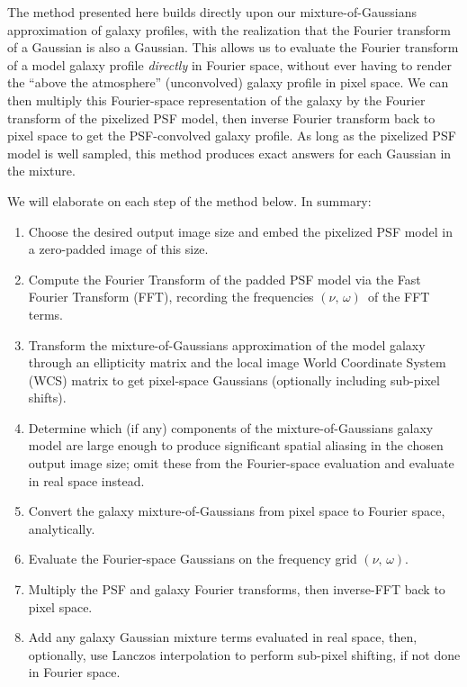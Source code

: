 \documentclass[11pt,letterpaper]{aastex63}
\newcommand{\pixelfreqs}{$(\nu,\, \omega)$}
\begin{document}
The method presented here builds directly upon our mixture-of-Gaussians
approximation of galaxy profiles, with the realization that the
Fourier transform of a Gaussian is also a Gaussian.  This allows us to
evaluate the Fourier transform of a model galaxy profile \emph{directly} in Fourier
space, without ever having to render the ``above the atmosphere''
(unconvolved) galaxy profile in pixel space.
We can then multiply this Fourier-space
representation of the galaxy by the Fourier transform of the pixelized
PSF model, then inverse Fourier transform back to pixel space to get
the PSF-convolved galaxy profile.
%
As long as the pixelized PSF model is well sampled, this method produces
exact answers for each Gaussian in the mixture.

We will elaborate on each step of the method below.  In summary:
\begin{enumerate}
\item Choose the desired output image size and embed the pixelized PSF
  model in a zero-padded image of this size.
\item Compute the Fourier Transform of the padded PSF model via the
  Fast Fourier Transform (FFT),
  recording the frequencies \pixelfreqs\ of the FFT terms.
\item Transform the mixture-of-Gaussians approximation of the model
  galaxy through an ellipticity matrix and the local image World
  Coordinate System (WCS) matrix to get pixel-space Gaussians
  (optionally including sub-pixel shifts).
\item Determine which (if any) components of the mixture-of-Gaussians
  galaxy model are large enough to produce significant spatial
  aliasing in the chosen output image size; omit these from the
  Fourier-space evaluation and evaluate in real space instead.
\item Convert the galaxy mixture-of-Gaussians from pixel space to Fourier space,
  analytically.
\item Evaluate the Fourier-space Gaussians on the frequency grid \pixelfreqs.
\item Multiply the PSF and galaxy Fourier transforms, then inverse-FFT
  back to pixel space.
\item Add any galaxy Gaussian mixture terms evaluated in real space,
  then, optionally, use Lanczos interpolation to perform sub-pixel
  shifting, if not done in Fourier space.
\end{enumerate}
\end{document}
